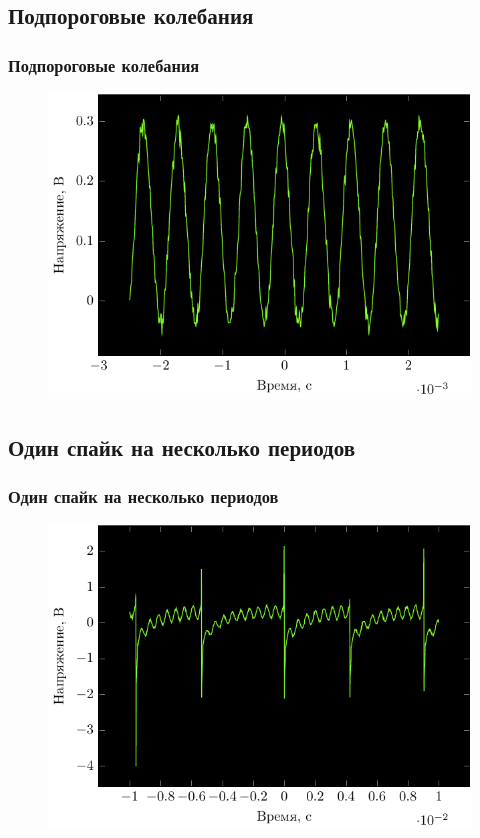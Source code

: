 \subsection{Подпороговые колебания}
\begin{frame}%
	\frametitle{Подпороговые колебания}
	\begin{figure}[h]
		\hspace{-2em}
		\includegraphics[]{img/osci}
	\end{figure}
\end{frame}
\subsection{Один спайк на несколько периодов}
\begin{frame}%
	\frametitle{Один спайк на несколько периодов}
	\begin{figure}[h]
		\hspace{-2em}
		\includegraphics[]{img/spike}
	\end{figure}
\end{frame}
